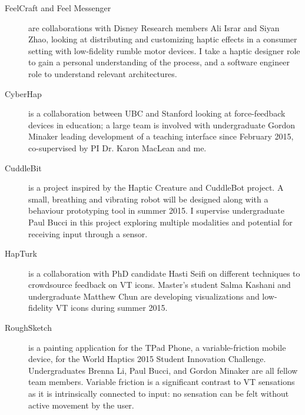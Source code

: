 \begin{description}
	\item[FeelCraft and Feel Messenger] are collaborations with Disney Research members Ali Israr and Siyan Zhao, looking at distributing and customizing haptic effects in a consumer setting with low-fidelity rumble motor devices.
	I take a haptic designer role to gain a personal understanding of the process, and a software engineer role to understand relevant architectures. %

	\item[CyberHap] is a collaboration between UBC and Stanford looking at force-feedback devices in education; a large team is involved with undergraduate Gordon Minaker leading development of a teaching interface since February 2015, co-supervised by PI Dr. Karon MacLean and me.
	
	\item[CuddleBit] is a project inspired by the Haptic Creature and CuddleBot project. A small, breathing and vibrating robot will be designed along with a behaviour prototyping tool in summer 2015.
	I supervise undergraduate Paul Bucci in this project exploring multiple modalities and potential for receiving input through a sensor.

	\item[HapTurk] is a collaboration with PhD candidate Hasti Seifi on different techniques to crowdsource feedback on VT icons. Master's student Salma Kashani and undergraduate Matthew Chun are developing visualizations and low-fidelity VT icons during summer 2015.

	\item[RoughSketch] is a painting application for the TPad Phone, a variable-friction mobile device, for the World Haptics 2015 Student Innovation Challenge. Undergraduates Brenna Li, Paul Bucci, and Gordon Minaker are all fellow team members. Variable friction is a significant contrast to VT sensations as it is intrinsically connected to input: no sensation can be felt without active movement by the user.
\end{description}





